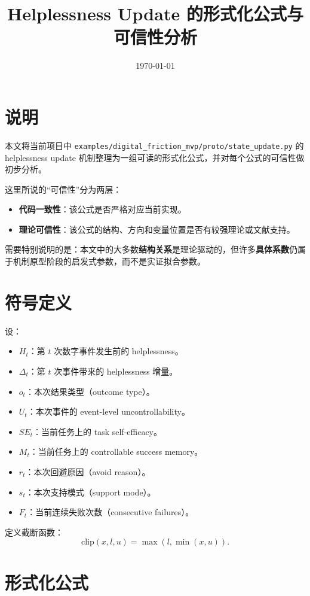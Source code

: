 \documentclass[11pt]{article}
\title{Helplessness Update 的形式化公式与可信性分析}
\author{}
\date{\today}
\newcommand{\clip}{\mathrm{clip}}
\begin{document}
\maketitle

\section{说明}
本文将当前项目中 \texttt{examples/digital\_friction\_mvp/proto/state\_update.py} 的 helplessness update 机制整理为一组可读的形式化公式，并对每个公式的可信性做初步分析。

这里所说的“可信性”分为两层：
\begin{itemize}
    \item \textbf{代码一致性}：该公式是否严格对应当前实现。
    \item \textbf{理论可信性}：该公式的结构、方向和变量位置是否有较强理论或文献支持。
\end{itemize}

需要特别说明的是：本文中的大多数\textbf{结构关系}是理论驱动的，但许多\textbf{具体系数}仍属于机制原型阶段的启发式参数，而不是实证拟合参数。

\section{符号定义}
设：
\begin{itemize}
    \item $H_t$：第 $t$ 次数字事件发生前的 helplessness。
    \item $\Delta_t$：第 $t$ 次事件带来的 helplessness 增量。
    \item $o_t$：本次结果类型（outcome type）。
    \item $U_t$：本次事件的 event-level uncontrollability。
    \item $SE_t$：当前任务上的 task self-efficacy。
    \item $M_t$：当前任务上的 controllable success memory。
    \item $r_t$：本次回避原因（avoid reason）。
    \item $s_t$：本次支持模式（support mode）。
    \item $F_t$：当前连续失败次数（consecutive failures）。
\end{itemize}

定义截断函数：
\[
\clip(x,l,u)=\max(l,\min(x,u)).
\]

\section{形式化公式}
\end{document}
